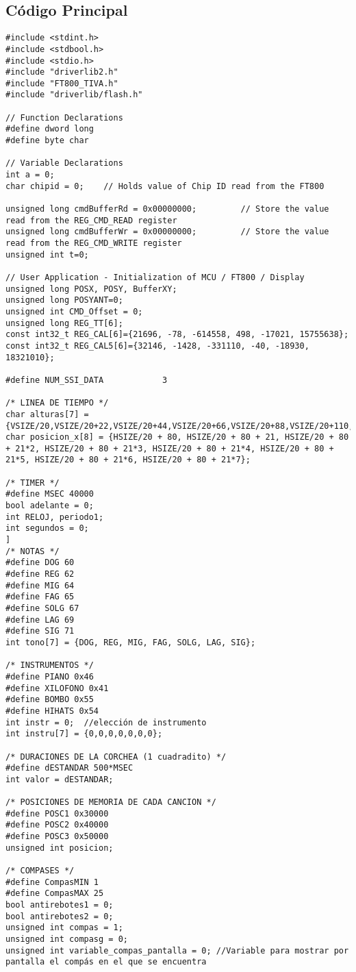 \documentclass[12pt,a4paper]{article}
\begin{document}
\subsection{Código Principal}
\begin{lstlisting}[basicstyle=\footnotesize] 
#include <stdint.h>
#include <stdbool.h>
#include <stdio.h>
#include "driverlib2.h"
#include "FT800_TIVA.h"
#include "driverlib/flash.h"

// Function Declarations
#define dword long
#define byte char

// Variable Declarations
int a = 0;
char chipid = 0;    // Holds value of Chip ID read from the FT800

unsigned long cmdBufferRd = 0x00000000;         // Store the value read from the REG_CMD_READ register
unsigned long cmdBufferWr = 0x00000000;         // Store the value read from the REG_CMD_WRITE register
unsigned int t=0;

// User Application - Initialization of MCU / FT800 / Display
unsigned long POSX, POSY, BufferXY;
unsigned long POSYANT=0;
unsigned int CMD_Offset = 0;
unsigned long REG_TT[6];
const int32_t REG_CAL[6]={21696, -78, -614558, 498, -17021, 15755638};
const int32_t REG_CAL5[6]={32146, -1428, -331110, -40, -18930, 18321010};

#define NUM_SSI_DATA            3

/* LINEA DE TIEMPO */
char alturas[7] = {VSIZE/20,VSIZE/20+22,VSIZE/20+44,VSIZE/20+66,VSIZE/20+88,VSIZE/20+110,VSIZE/20+132};
char posicion_x[8] = {HSIZE/20 + 80, HSIZE/20 + 80 + 21, HSIZE/20 + 80 + 21*2, HSIZE/20 + 80 + 21*3, HSIZE/20 + 80 + 21*4, HSIZE/20 + 80 + 21*5, HSIZE/20 + 80 + 21*6, HSIZE/20 + 80 + 21*7};

/* TIMER */
#define MSEC 40000
bool adelante = 0;
int RELOJ, periodo1;
int segundos = 0;
] 
/* NOTAS */
#define DOG 60
#define REG 62
#define MIG 64
#define FAG 65
#define SOLG 67
#define LAG 69
#define SIG 71
int tono[7] = {DOG, REG, MIG, FAG, SOLG, LAG, SIG};

/* INSTRUMENTOS */
#define PIANO 0x46
#define XILOFONO 0x41
#define BOMBO 0x55
#define HIHATS 0x54
int instr = 0;  //elección de instrumento
int instru[7] = {0,0,0,0,0,0,0};

/* DURACIONES DE LA CORCHEA (1 cuadradito) */
#define dESTANDAR 500*MSEC
int valor = dESTANDAR;

/* POSICIONES DE MEMORIA DE CADA CANCION */
#define POSC1 0x30000
#define POSC2 0x40000
#define POSC3 0x50000
unsigned int posicion;

/* COMPASES */
#define CompasMIN 1
#define CompasMAX 25
bool antirebotes1 = 0;
bool antirebotes2 = 0;
unsigned int compas = 1;
unsigned int compasg = 0;
unsigned int variable_compas_pantalla = 0; //Variable para mostrar por pantalla el compás en el que se encuentra


\end{lstlisting}
\end{document}
